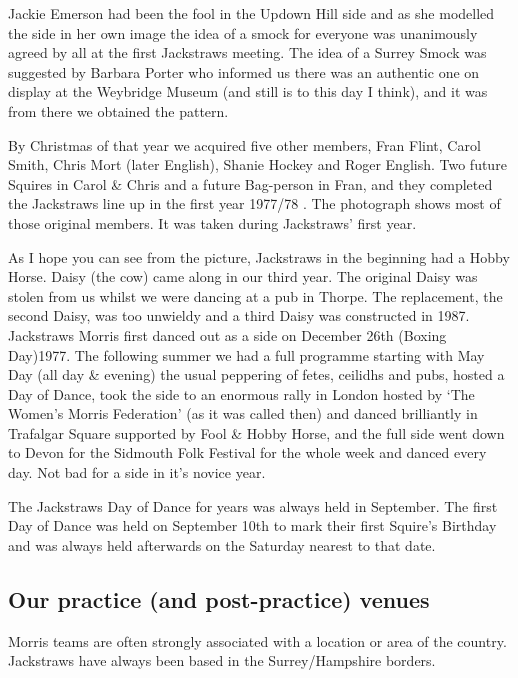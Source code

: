 \documentclass[
]{article}
\begin{document}
Jackie Emerson had been the fool in the Updown Hill side and as she
modelled the side in her own image the idea of a smock for everyone was
unanimously agreed by all at the first Jackstraws meeting. The idea of a
Surrey Smock was suggested by Barbara Porter who informed us there was
an authentic one on display at the Weybridge Museum (and still is to
this day I think), and it was from there we obtained the pattern.

By Christmas of that year we acquired five other members, Fran Flint,
Carol Smith, Chris Mort (later English), Shanie Hockey and Roger
English. Two future Squires in Carol \& Chris and a future Bag-person in
Fran, and they completed the Jackstraws line up in the first year
1977/78 . The photograph shows most of those original members. It was
taken during Jackstraws' first year.

As I hope you can see from the picture, Jackstraws in the beginning had
a Hobby Horse. Daisy (the cow) came along in our third year. The
original Daisy was stolen from us whilst we were dancing at a pub in
Thorpe. The replacement, the second Daisy, was too unwieldy and a third
Daisy was constructed in 1987. Jackstraws Morris first danced out as a
side on December 26th (Boxing Day)1977. The following summer we had a
full programme starting with May Day (all day \& evening) the usual
peppering of fetes, ceilidhs and pubs, hosted a Day of Dance, took the
side to an enormous rally in London hosted by `The Women's Morris
Federation' (as it was called then) and danced brilliantly in Trafalgar
Square supported by Fool \& Hobby Horse, and the full side went down to
Devon for the Sidmouth Folk Festival for the whole week and danced every
day. Not bad for a side in it's novice year.

The Jackstraws Day of Dance for years was always held in September. The
first Day of Dance was held on September 10th to mark their first
Squire's Birthday and was always held afterwards on the Saturday nearest
to that date.

\hypertarget{our-practice-and-post-practice-venues}{%
\subsection{Our practice (and post-practice)
venues}\label{our-practice-and-post-practice-venues}}

Morris teams are often strongly associated with a location or area of
the country. Jackstraws have always been based in the Surrey/Hampshire
borders.
\end{document}
